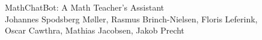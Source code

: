 \begin{titlepage}
\begin{center}
  \end{center}
  \vfill
  \vspace*{-1cm}
  \begin{center}
        \begin{minipage}{0.65\textwidth}
            \begin{flushleft}
                \fontsize{20pt}{20pt}\selectfont
                \textcolor{aaucolor}{MathChatBot: A Math Teacher's Assistant}\\
                \vspace*{0.5cm}
                \fontsize{10pt}{8pt}\selectfont
                \textcolor{aaucolor}{Johannes Spodsberg Møller, Rasmus Brinch-Nielsen, Floris Leferink,}\\
                \vspace*{0.1cm}
                \textcolor{aaucolor}{Oscar Cawthra, Mathias Jacobsen, Jakob Precht}\\
            \end{flushleft}
        \end{minipage}
  \end{center}
  \vfill
\end{titlepage}
\restoregeometry
\clearpage